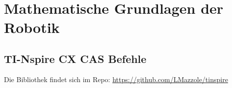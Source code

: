 \section{Mathematische Grundlagen der Robotik }

\subsection{TI-Nspire CX CAS Befehle}
Die Bibliothek findet sich im Repo:  \href{LMazzole/tinspire}{https://github.com/LMazzole/tinspire}\newline
%
%
	
